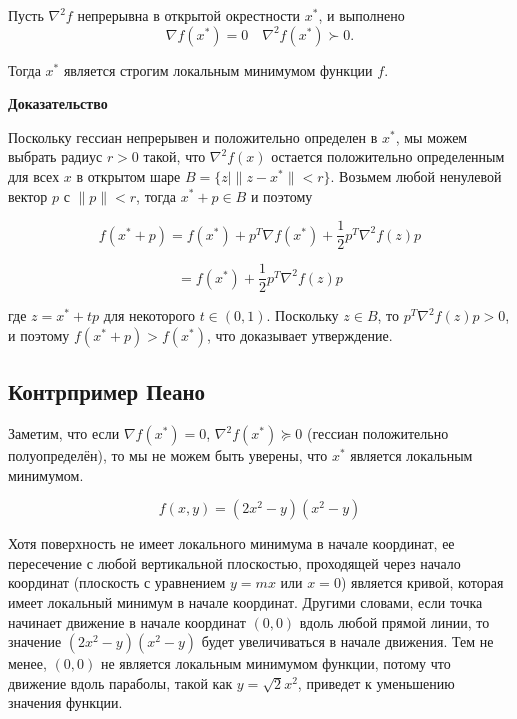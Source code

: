 \documentclass[
  russian,
  letterpaper,
  DIV=11,
  numbers=noendperiod]{scrartcl}
\begin{document}
\begin{tcolorbox}[enhanced jigsaw, opacityback=0, coltitle=black, left=2mm, colframe=quarto-callout-color-frame, rightrule=.15mm, titlerule=0mm, leftrule=.75mm, breakable, colback=white, bottomrule=.15mm, bottomtitle=1mm, toptitle=1mm, opacitybacktitle=0.6, title=\textcolor{quarto-callout-color}{\faInfo}\hspace{0.5em}{Достаточные условия оптимальности второго порядка}, colbacktitle=quarto-callout-color!10!white, arc=.35mm, toprule=.15mm]

Пусть \(\nabla^2 f\) непрерывна в открытой окрестности \(x^*\), и
выполнено \[
\nabla f(x^*) = 0 \quad \nabla^2 f(x^*) \succ 0.
\]

Тогда \(x^*\) является строгим локальным минимумом функции \(f\).

\textbf{Доказательство}

Поскольку гессиан непрерывен и положительно определен в \(x^*\), мы
можем выбрать радиус \(r > 0\) такой, что \(\nabla^2 f(x)\) остается
положительно определенным для всех \(x\) в открытом шаре
\(B = \{ z \mid \|z - x^*\| < r \}\). Возьмем любой ненулевой вектор
\(p\) с \(\|p\| < r\), тогда \(x^* + p \in B\) и поэтому

\[ 
f(x^* + p) = f(x^*) + p^T \nabla f(x^*) + \frac{1}{2} p^T \nabla^2 f(z) p
\]

\[ 
= f(x^*) + \frac{1}{2} p^T \nabla^2 f(z) p
\]

где \(z = x^* + tp\) для некоторого \(t \in (0,1)\). Поскольку
\(z \in B\), то \(p^T \nabla^2 f(z) p > 0\), и поэтому
\(f(x^* + p) > f(x^*)\), что доказывает утверждение.

\end{tcolorbox}

\subsection{Контрпример
Пеано}\label{ux43aux43eux43dux442ux440ux43fux440ux438ux43cux435ux440-ux43fux435ux430ux43dux43e}

Заметим, что если \(\nabla f(x^*) = 0\), \(\nabla^2 f(x^*) \succeq 0\)
(гессиан положительно полуопределён), то мы не можем быть уверены, что
\(x^*\) является локальным минимумом.

\[
f(x,y) = (2x^2 - y)(x^2 - y)
\]

Хотя поверхность не имеет локального минимума в начале координат, ее
пересечение с любой вертикальной плоскостью, проходящей через начало
координат (плоскость с уравнением \(y=mx\) или \(x=0\)) является кривой,
которая имеет локальный минимум в начале координат. Другими словами,
если точка начинает движение в начале координат \((0,0)\) вдоль любой
прямой линии, то значение \((2x^2-y)(x^2 - y)\) будет увеличиваться в
начале движения. Тем не менее, \((0,0)\) не является локальным минимумом
функции, потому что движение вдоль параболы, такой как
\(y=\sqrt{2}x^2\), приведет к уменьшению значения функции.
\end{document}
